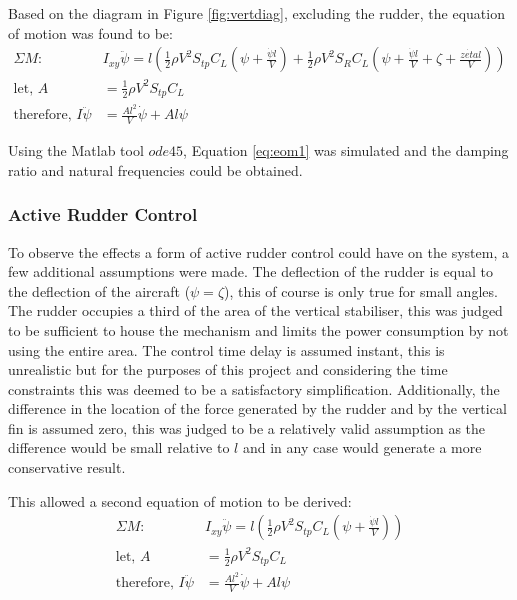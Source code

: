 \documentclass[11pt,a4paper]{article}
\begin{document}
Based on the diagram in Figure \ref{fig:vertdiag}, excluding the rudder, the equation of motion was found to be:
\begin{align}
\Sigma M:& I_{xy}\ddot{\psi}=l(\frac{1}{2}\rho V^2 S_{tp}C_L(\psi+\frac{\dot{\psi}l}{V})+\frac{1}{2}\rho V^2 S_R C_L(\psi +\frac{\dot{\psi}l}{V}+\zeta+\frac{\dot{zeta}l}{V})) \\
\text{let,       }      A&=\frac{1}{2}\rho V^2 S_{tp}C_L\\
 \text{therefore,       }    I\ddot{\psi}&=\frac{Al^2}{V}\dot{\psi}+A l\psi \label{eq:eom1}
\end{align}{}

Using the Matlab tool $ode45$, Equation \ref{eq:eom1} was simulated and the damping ratio and natural frequencies could be obtained. \\

\subsubsection{Active Rudder Control}

To observe the effects a form of active rudder control could have on the system, a few additional assumptions were made. The deflection of the rudder is equal to the deflection of the aircraft ($\psi=\zeta$), this of course is only true for small angles. The rudder occupies a third of the area of the vertical stabiliser, this was judged to be sufficient to house the mechanism and limits the power consumption by not using the entire area. The control time delay is assumed instant, this is unrealistic but for the purposes of this project and considering the time constraints this was deemed to be a satisfactory simplification. Additionally, the difference in the location of the force generated by the rudder and by the vertical fin is assumed zero, this was judged to be a relatively valid assumption as the difference would be small relative to $l$ and in any case would generate a more conservative result.

This allowed a second equation of motion to be derived:
\begin{align}
\Sigma M:& I_{xy}\ddot{\psi}=l(\frac{1}{2}\rho V^2 S_{tp}C_L(\psi+\frac{\dot{\psi}l}{V})) \\
\text{let,       }      A&=\frac{1}{2}\rho V^2 S_{tp}C_L\\
 \text{therefore,       }    I\ddot{\psi}&=\frac{Al^2}{V}\dot{\psi}+A l\psi \label{eq:eom1}
\end{align}{}
\end{document}
